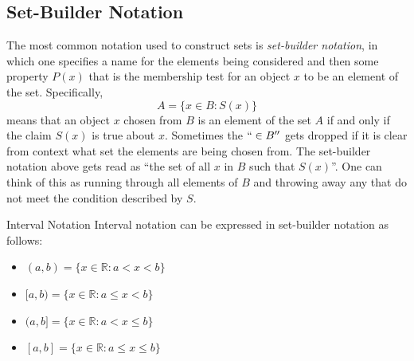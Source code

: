 \subsection*{Set-Builder Notation}
 The most common notation used to construct sets is \emph{set-builder notation}, in which one specifies a name for the elements being considered and then some property $P(x)$ that is the membership test for an object $x$ to be an element of the set.  Specifically,
$$A=\lbrace x\in B : S(x) \rbrace$$
means that an object $x$ chosen from $B$ is an element of the set $A$ if and only if the claim $S(x)$ is true about $x$.  Sometimes the $``\in B''$ gets dropped if it is clear from context what set the elements are being chosen from.  The set-builder notation above gets read as ``the set of all $x$ in $B$ such that $S(x)$''.  One can think of this as running through all elements of $B$ and throwing away any that do not meet the condition described by $S$.  
 \begin{example}{Interval Notation}  Interval notation can be expressed in set-builder notation as follows:
 
 \begin{itemize}
 \item $(a,b)=\lbrace x\in \mathbb{R}: a<x<b \rbrace$
 \item $[a,b)=\lbrace x\in \mathbb{R}: a\leq x<b \rbrace$
 \item $(a,b]=\lbrace x\in \mathbb{R}: a<x\leq b \rbrace$
 \item $[a,b]=\lbrace x\in \mathbb{R}: a\leq x\leq b \rbrace$
 \end{itemize}
 \end{example}

